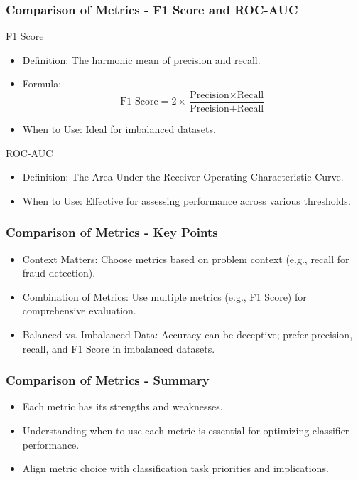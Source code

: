 \documentclass[aspectratio=169]{beamer}
\begin{document}
\begin{frame}[fragile]
    \frametitle{Comparison of Metrics - F1 Score and ROC-AUC}
    \begin{block}{F1 Score}
        \begin{itemize}
            \item Definition: The harmonic mean of precision and recall.
            \item Formula:
            \begin{equation}
                \text{F1 Score} = 2 \times \frac{\text{Precision} \times \text{Recall}}{\text{Precision} + \text{Recall}}
            \end{equation}
            \item When to Use: Ideal for imbalanced datasets.
        \end{itemize}
    \end{block}

    \begin{block}{ROC-AUC}
        \begin{itemize}
            \item Definition: The Area Under the Receiver Operating Characteristic Curve.
            \item When to Use: Effective for assessing performance across various thresholds.
        \end{itemize}
    \end{block}
\end{frame}

\begin{frame}[fragile]
    \frametitle{Comparison of Metrics - Key Points}
    \begin{itemize}
        \item Context Matters: Choose metrics based on problem context (e.g., recall for fraud detection).
        \item Combination of Metrics: Use multiple metrics (e.g., F1 Score) for comprehensive evaluation.
        \item Balanced vs. Imbalanced Data: Accuracy can be deceptive; prefer precision, recall, and F1 Score in imbalanced datasets.
    \end{itemize}
\end{frame}

\begin{frame}[fragile]
    \frametitle{Comparison of Metrics - Summary}
    \begin{itemize}
        \item Each metric has its strengths and weaknesses.
        \item Understanding when to use each metric is essential for optimizing classifier performance.
        \item Align metric choice with classification task priorities and implications.
    \end{itemize}
\end{frame}
\end{document}
